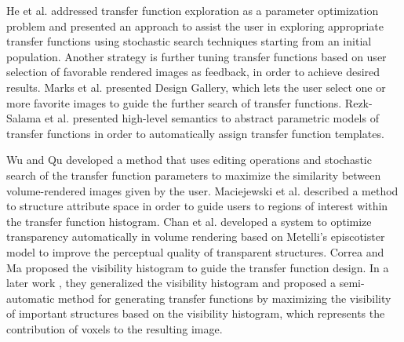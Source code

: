 \documentclass{egpubl}
\begin{document}
He et al. \cite{he_generation_1996} addressed transfer function exploration as a parameter optimization problem and presented an approach to assist the user in exploring appropriate transfer functions using stochastic search techniques starting from an initial population.
Another strategy is further tuning transfer functions based on user selection of favorable rendered images as feedback, in order to achieve desired results.
Marks et al. \cite{marks_design_1997} presented Design Gallery, which lets the user select one or more favorite images to guide the further search of transfer functions.
Rezk-Salama et al. \cite{rezk-salama_automatic_2000} presented high-level semantics to abstract parametric models of transfer functions in order to automatically assign transfer function templates.

Wu and Qu \cite{wu_interactive_2007} developed a method that uses editing operations and stochastic search of the transfer function parameters to maximize the similarity between volume-rendered images given by the user.
Maciejewski et al. \cite{maciejewski_structuring_2009} described a method to structure attribute space in order to guide users to regions of interest within the transfer function histogram.
Chan et al. \cite{chan_perception-based_2009} developed a system to optimize transparency automatically in volume rendering based on Metelli's episcotister model to improve the perceptual quality of transparent structures.
Correa and Ma \cite{correa_visibility-driven_2009} proposed the visibility histogram to guide the transfer function design. In a later work \cite{correa_visibility_2011}, they generalized the visibility histogram and proposed a semi-automatic method for generating transfer functions by maximizing the visibility of important structures based on the visibility histogram, which represents the contribution of voxels to the resulting image.


\end{document}

